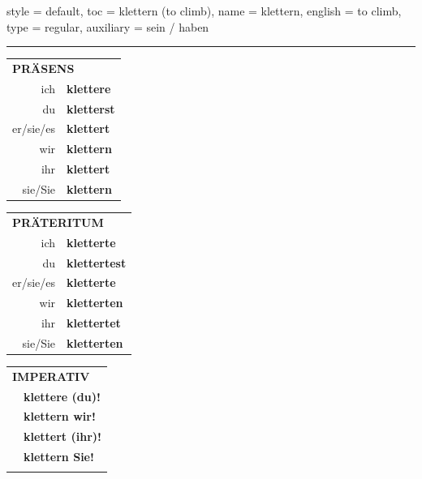 \begin{verbentry}{
  style = {default},
  toc = {klettern (to climb)},
  name = {klettern},
  english = {to climb},
  type = {regular},
  auxiliary = {sein / haben}
}
 
    
     \vspace{5pt}

    \hrule
    
    \vspace{5pt}

  \begin{tabular}{rl}
     \multicolumn{2}{l}{\textbf{PRÄSENS} }\\
    ich & \textbf{klettere}\\
    du & \textbf{kletterst}\\
    er/sie/es & \textbf{klettert}\\
    wir & \textbf{klettern}\\
    ihr & \textbf{klettert}\\
    sie/Sie & \textbf{klettern}\\
  \end{tabular}
  \hfill
     \begin{tabular}{rl}
    \multicolumn{2}{l}{\textbf{PRÄTERITUM} }\\
    ich & \textbf{kletterte}\\
    du & \textbf{klettertest}\\
    er/sie/es & \textbf{kletterte}\\
    wir & \textbf{kletterten}\\
    ihr & \textbf{klettertet}\\
    sie/Sie & \textbf{kletterten}\\
  \end{tabular}
  \hfill
  \begin{tabular}{rl}
     \multicolumn{2}{l}{\textbf{IMPERATIV} }\\
   & \textbf{klettere (du)!}\\
   & \textbf{klettern wir!}\\
   & \textbf{klettert (ihr)!}\\
   & \textbf{klettern Sie!}\\
   & \vspace{10pt}
  \end{tabular}

    \vspace{10pt}


\end{verbentry}
